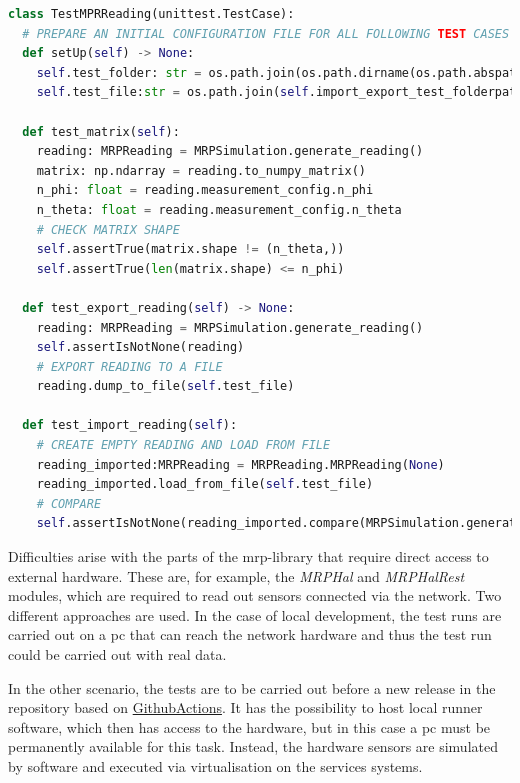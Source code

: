 \begin{lstlisting}[language=Python, caption={Example of a PyTest class for testing the internal functions of the MRPReading and MRPSimulation modules}, label=lst:pytest_example_code]
class TestMPRReading(unittest.TestCase):
  # PREPARE AN INITIAL CONFIGURATION FILE FOR ALL FOLLOWING TEST CASES IN THIS FILE
  def setUp(self) -> None:
    self.test_folder: str = os.path.join(os.path.dirname(os.path.abspath(__file__)), "tmp")
    self.test_file:str = os.path.join(self.import_export_test_folderpath, "tmp")

  def test_matrix(self):
    reading: MRPReading = MRPSimulation.generate_reading()
    matrix: np.ndarray = reading.to_numpy_matrix()
    n_phi: float = reading.measurement_config.n_phi
    n_theta: float = reading.measurement_config.n_theta
    # CHECK MATRIX SHAPE
    self.assertTrue(matrix.shape != (n_theta,))
    self.assertTrue(len(matrix.shape) <= n_phi)

  def test_export_reading(self) -> None:
    reading: MRPReading = MRPSimulation.generate_reading()
    self.assertIsNotNone(reading)
    # EXPORT READING TO A FILE
    reading.dump_to_file(self.test_file)

  def test_import_reading(self):
    # CREATE EMPTY READING AND LOAD FROM FILE
    reading_imported:MRPReading = MRPReading.MRPReading(None)
    reading_imported.load_from_file(self.test_file)
    # COMPARE
    self.assertIsNotNone(reading_imported.compare(MRPSimulation.generate_reading()))
\end{lstlisting}

Difficulties arise with the parts of the \gls{mrp}-library that require
direct access to external hardware. These are, for example, the
\emph{MRPHal} and \emph{MRPHalRest} modules, which are required to read
out sensors connected via the network. Two different approaches are
used. In the case of local development, the test runs are carried out on
a \gls{pc} that can reach the network hardware and thus the test run
could be carried out with real data.

In the other scenario, the tests are to be carried out before a new
release in the repository based on
\href{https://github.com/features/actions}{GithubActions}. It has the
possibility to host local runner software, which then has access to the
hardware, but in this case a \gls{pc} must be permanently available for
this task. Instead, the hardware sensors are simulated by software and
executed via virtualisation on the services systems.

